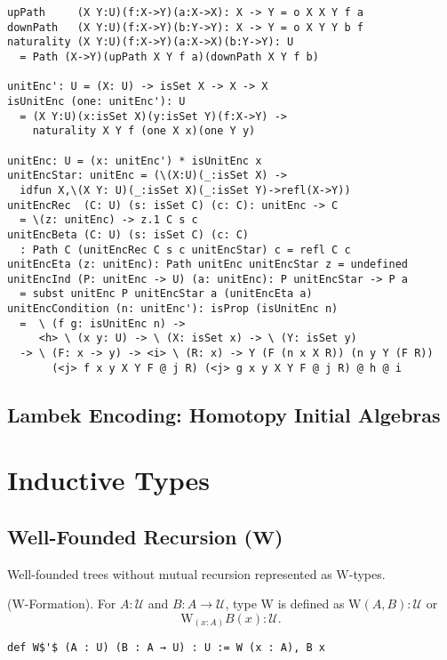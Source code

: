 \documentclass{article}
\begin{document}
\begin{lstlisting}[mathescape=true]
upPath     (X Y:U)(f:X->Y)(a:X->X): X -> Y = o X X Y f a
downPath   (X Y:U)(f:X->Y)(b:Y->Y): X -> Y = o X Y Y b f
naturality (X Y:U)(f:X->Y)(a:X->X)(b:Y->Y): U
  = Path (X->Y)(upPath X Y f a)(downPath X Y f b)

unitEnc': U = (X: U) -> isSet X -> X -> X
isUnitEnc (one: unitEnc'): U
  = (X Y:U)(x:isSet X)(y:isSet Y)(f:X->Y) ->
    naturality X Y f (one X x)(one Y y)

unitEnc: U = (x: unitEnc') * isUnitEnc x
unitEncStar: unitEnc = (\(X:U)(_:isSet X) ->
  idfun X,\(X Y: U)(_:isSet X)(_:isSet Y)->refl(X->Y))
unitEncRec  (C: U) (s: isSet C) (c: C): unitEnc -> C
  = \(z: unitEnc) -> z.1 C s c
unitEncBeta (C: U) (s: isSet C) (c: C)
  : Path C (unitEncRec C s c unitEncStar) c = refl C c
unitEncEta (z: unitEnc): Path unitEnc unitEncStar z = undefined
unitEncInd (P: unitEnc -> U) (a: unitEnc): P unitEncStar -> P a
  = subst unitEnc P unitEncStar a (unitEncEta a)
unitEncCondition (n: unitEnc'): isProp (isUnitEnc n)
  =  \ (f g: isUnitEnc n) ->
     <h> \ (x y: U) -> \ (X: isSet x) -> \ (Y: isSet y)
  -> \ (F: x -> y) -> <i> \ (R: x) -> Y (F (n x X R)) (n y Y (F R))
       (<j> f x y X Y F @ j R) (<j> g x y X Y F @ j R) @ h @ i
\end{lstlisting}

\subsection{Lambek Encoding: Homotopy Initial Algebras}

\newpage
\section{Inductive Types}

\subsection{Well-Founded Recursion (\(\mathbf{W}\))}

Well-founded trees without mutual recursion represented as $\mathrm{W}$-types.

\begin{definition} ($\mathrm{W}$-Formation).
For $A : \mathcal{U}$ and $B : A \rightarrow \mathcal{U}$, type $\mathrm{W}$
is defined as $\mathrm{W}(A,B) : \mathcal{U}$ or
$$
   \mathrm{W}_{(x : A)} B(x) : \mathcal{U}.
$$
\begin{lstlisting}[mathescape=true]
def W$'$ (A : U) (B : A → U) : U := W (x : A), B x
\end{lstlisting}
\end{definition}
\end{document}

